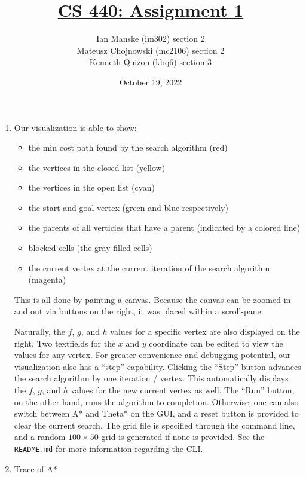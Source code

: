 \documentclass[12pt]{article}
\title{\vspace{-3em}\underline{CS 440: Assignment 1}}
\author{
  Ian Manske (im302) section 2\\
  Mateusz Chojnowski (mc2106) section 2\\
  Kenneth Quizon (kbq6) section 3}
\date{October 19, 2022}
\begin{document}
\maketitle

\section{}
\begin{enumerate}[label={\large\textbf{\alph*)}}]
\item
Our visualization is able to show:
\begin{itemize}
  \item the min cost path found by the search algorithm (red)
  \item the vertices in the closed list (yellow)
  \item the vertices in the open list (cyan)
  \item the start and goal vertex (green and blue respectively)
  \item the parents of all verticies that have a parent (indicated by a colored line)
  \item blocked cells (the gray filled cells)
  \item the current vertex at the current iteration of the search algorithm (magenta)
\end{itemize}

This is all done by painting a canvas. Because the canvas can be zoomed in and out
via buttons on the right, it was placed within a scroll-pane.

Naturally, the $f$, $g$, and $h$ values for a specific vertex are also displayed on the right.
Two textfields for the $x$ and $y$ coordinate can be edited to view the values for any vertex.
For greater convenience and debugging potential, our visualization also has a ``step'' capability.
Clicking the ``Step'' button advances the search algorithm by one iteration / vertex.
This automatically displays the $f$, $g$, and $h$ values for the new current vertex as well.
The ``Run'' button, on the other hand, runs the algorithm to completion.
Otherwise, one can also switch between A* and Theta* on the GUI,
and a reset button is provided to clear the current search.
The grid file is specified through the command line,
and a random $100 \times 50$ grid is generated if none is provided.
See the \verb|README.md| for more information regarding the CLI.

\item Trace of A*


\end{enumerate}
\end{document}
